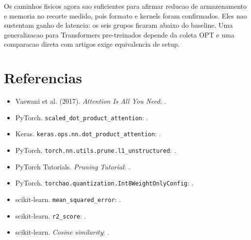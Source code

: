 Os caminhos fisicos agora sao suficientes para afirmar reducao de armazenamento
e memoria no recorte medido, pois formato e kernels foram confirmados. Eles nao
sustentam ganho de latencia: os seis grupos ficaram abaixo do baseline. Uma
generalizacao para Transformers pre-treinados depende da coleta OPT e uma
comparacao direta com artigos exige equivalencia de setup.



\section{Referencias}


\begin{itemize}
\item Vaswani et al. (2017). \emph{Attention Is All You Need}:
.
\item PyTorch. \texttt{scaled\_\allowbreak{}dot\_\allowbreak{}product\_\allowbreak{}attention}:
.
\item Keras. \texttt{keras.\allowbreak{}ops.\allowbreak{}nn.\allowbreak{}dot\_\allowbreak{}product\_\allowbreak{}attention}:
.
\item PyTorch. \texttt{torch.\allowbreak{}nn.\allowbreak{}utils.\allowbreak{}prune.\allowbreak{}l1\_\allowbreak{}unstructured}:
.
\item PyTorch Tutorials. \emph{Pruning Tutorial}:
.
\item PyTorch. \texttt{torchao.\allowbreak{}quantization.\allowbreak{}Int8WeightOnlyConfig}:
.
\item scikit-learn. \texttt{mean\_\allowbreak{}squared\_\allowbreak{}error}:
.
\item scikit-learn. \texttt{r2\_\allowbreak{}score}:
.
\item scikit-learn. \emph{Cosine similarity}:
.
\end{itemize}
